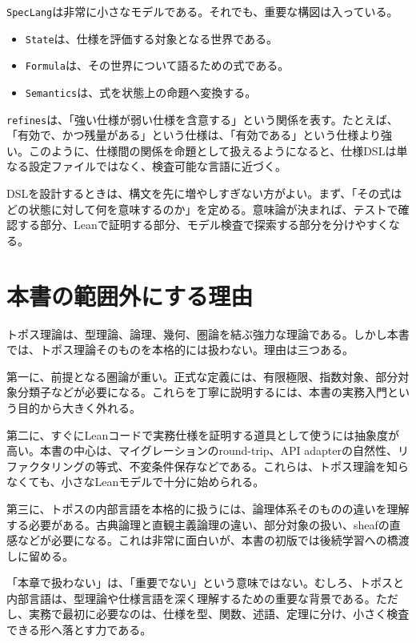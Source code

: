 \texttt{SpecLang}は非常に小さなモデルである。それでも、重要な構図は入っている。

\begin{itemize}
  \item \texttt{State}は、仕様を評価する対象となる世界である。
  \item \texttt{Formula}は、その世界について語るための式である。
  \item \texttt{Semantics}は、式を状態上の命題へ変換する。
\end{itemize}

\texttt{refines}は、「強い仕様が弱い仕様を含意する」という関係を表す。たとえば、「有効で、かつ残量がある」という仕様は、「有効である」という仕様より強い。このように、仕様間の関係を命題として扱えるようになると、仕様DSLは単なる設定ファイルではなく、検査可能な言語に近づく。

\begin{softwarebox}
DSLを設計するときは、構文を先に増やしすぎない方がよい。まず、「その式はどの状態に対して何を意味するのか」を定める。意味論が決まれば、テストで確認する部分、Leanで証明する部分、モデル検査で探索する部分を分けやすくなる。
\end{softwarebox}

\section{本書の範囲外にする理由}

トポス理論は、型理論、論理、幾何、圏論を結ぶ強力な理論である。しかし本書では、トポス理論そのものを本格的には扱わない。理由は三つある。

第一に、前提となる圏論が重い。正式な定義には、有限極限、指数対象、部分対象分類子などが必要になる。これらを丁寧に説明するには、本書の実務入門という目的から大きく外れる。

第二に、すぐにLeanコードで実務仕様を証明する道具として使うには抽象度が高い。本書の中心は、マイグレーションのround-trip、API adapterの自然性、リファクタリングの等式、不変条件保存などである。これらは、トポス理論を知らなくても、小さなLeanモデルで十分に始められる。

第三に、トポスの内部言語を本格的に扱うには、論理体系そのものの違いを理解する必要がある。古典論理と直観主義論理の違い、部分対象の扱い、sheafの直感などが必要になる。これは非常に面白いが、本書の初版では後続学習への橋渡しに留める。

\begin{warningbox}
「本章で扱わない」は、「重要でない」という意味ではない。むしろ、トポスと内部言語は、型理論や仕様言語を深く理解するための重要な背景である。ただし、実務で最初に必要なのは、仕様を型、関数、述語、定理に分け、小さく検査できる形へ落とす力である。
\end{warningbox}

